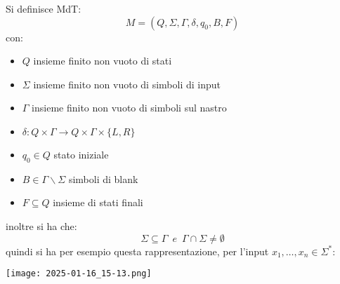 	\begin{definition}
		Si definisce MdT:
		$$M=(Q,\Sigma,\Gamma,\delta,q_0,B,F)$$
		con:
		\begin{itemize}
			\item $Q$ insieme finito non vuoto di stati
			\item $\Sigma$ insieme finito non vuoto di simboli di input
			\item $\Gamma$ insieme finito non vuoto di simboli sul nastro
			\item $\delta:Q\times\Gamma\to Q\times\Gamma\times\{L,R\}$
			\item $q_0\in Q$ stato iniziale
			\item $B\in\Gamma\backslash\Sigma$ simboli di blank
			\item $F\subseteq Q$ insieme di stati finali
		\end{itemize}
		inoltre si ha che:
		$$\Sigma\subseteq \Gamma\,\,\,e\,\,\,\Gamma\cap\Sigma\neq\emptyset$$
		quindi si ha per esempio questa rappresentazione, per l'input $x_1,\ldots ,x_n\in\Sigma^*$:
		\begin{center}
		\texttt{[image: 2025-01-16\_15-13.png]}


\end{center}
\end{definition}
